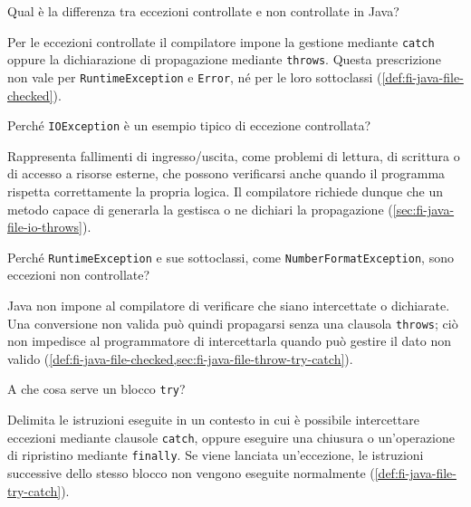\begin{exercise}
\label{ex:fi-esercizi-java-file-checked-unchecked}
Qual è la differenza tra eccezioni controllate e non
controllate in Java?
\end{exercise}

Per le eccezioni controllate il compilatore impone la gestione
mediante \texttt{catch} oppure la dichiarazione di propagazione
mediante \texttt{throws}. Questa prescrizione non vale per
\texttt{RuntimeException} e \texttt{Error}, né per le loro
sottoclassi
(\cref{def:fi-java-file-checked}).

\begin{exercise}
\label{ex:fi-esercizi-java-file-io-checked}
Perché \texttt{IOException} è un esempio tipico di eccezione
controllata?
\end{exercise}

Rappresenta fallimenti di ingresso/uscita, come problemi di
lettura, di scrittura o di accesso a risorse esterne, che possono
verificarsi anche quando il programma rispetta correttamente
la propria logica. Il compilatore richiede dunque che un metodo
capace di generarla la gestisca o ne dichiari la propagazione
(\cref{sec:fi-java-file-io-throws}).

\clearpage

\begin{exercise}
\label{ex:fi-esercizi-java-file-runtime-unchecked}
Perché \texttt{RuntimeException} e sue sottoclassi, come
\texttt{NumberFormatException}, sono eccezioni non controllate?
\end{exercise}

Java non impone al compilatore di verificare che siano
intercettate o dichiarate. Una conversione non valida può quindi
propagarsi senza una clausola \texttt{throws}; ciò non impedisce
al programmatore di intercettarla quando può gestire il dato
non valido
(\cref{def:fi-java-file-checked,sec:fi-java-file-throw-try-catch}).

\begin{exercise}
\label{ex:fi-esercizi-java-file-try}
A che cosa serve un blocco \texttt{try}?
\end{exercise}

Delimita le istruzioni eseguite in un contesto in cui è possibile
intercettare eccezioni mediante clausole \texttt{catch}, oppure
eseguire una chiusura o un'operazione di ripristino mediante
\texttt{finally}. Se viene lanciata un'eccezione, le istruzioni
successive dello stesso blocco non vengono eseguite normalmente
(\cref{def:fi-java-file-try-catch}).

